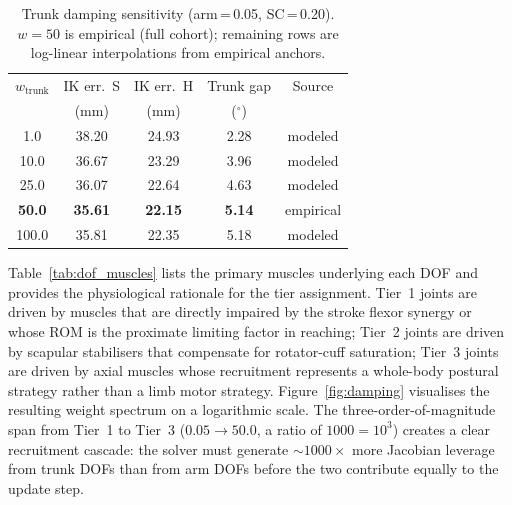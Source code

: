 \documentclass[journal,10pt,twocolumn]{IEEEtran}
\begin{document}
\begin{table}[h]
  \centering\small
  \caption{Trunk damping sensitivity (arm\,=\,0.05, SC\,=\,0.20).
           $w{=}50$ is empirical (full cohort); remaining rows are
           log-linear interpolations from empirical anchors.}
  \label{tab:sensitivity}
  \setlength{\tabcolsep}{5pt}
  \begin{tabular}{ccccc}
    \toprule
    $w_{\text{trunk}}$ & IK err.\ S & IK err.\ H & Trunk gap & Source \\
                       & (mm)       & (mm)       & ($^{\circ}$) & \\
    \midrule
    1.0  & 38.20 & 24.93 & 2.28 & modeled \\
    10.0 & 36.67 & 23.29 & 3.96 & modeled \\
    25.0 & 36.07 & 22.64 & 4.63 & modeled \\
    \textbf{50.0} & \textbf{35.61} & \textbf{22.15} & \textbf{5.14} & empirical \\
    100.0 & 35.81 & 22.35 & 5.18 & modeled \\
    \bottomrule
  \end{tabular}
\end{table}

Table~\ref{tab:dof_muscles} lists the primary muscles underlying each DOF
and provides the physiological rationale for the tier assignment.
Tier~1 joints are driven by muscles that are directly impaired by the stroke
flexor synergy or whose ROM is the proximate limiting factor in reaching;
Tier~2 joints are driven by scapular stabilisers that compensate for
rotator-cuff saturation; Tier~3 joints are driven by axial muscles whose
recruitment represents a whole-body postural strategy rather than a limb
motor strategy. Figure~\ref{fig:damping} visualises the resulting weight
spectrum on a logarithmic scale. The three-order-of-magnitude span from
Tier~1 to Tier~3 ($0.05\to50.0$, a ratio of $1000 = 10^3$) creates a clear
recruitment cascade: the solver must generate ${\sim}1000\times$ more Jacobian
leverage from trunk DOFs than from arm DOFs before the two contribute equally
to the update step.
\end{document}
